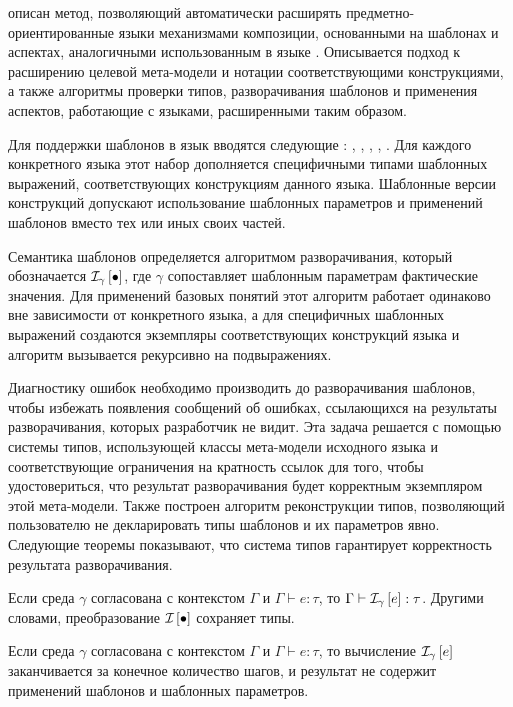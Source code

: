 \renewcommand{\thepart}{4}
 описан метод, позволяющий автоматически расширять предметно-ориентированные языки механизмами композиции, основанными на шаблонах и аспектах, аналогичными использованным в языке \GRM{}. Описывается подход к расширению целевой мета-модели и нотации соответствующими конструкциями, а также алгоритмы проверки типов, разворачивания шаблонов и применения аспектов, работающие с языками, расширенными таким образом.

Для поддержки шаблонов в язык вводятся следующие : , , , , . Для каждого конкретного языка этот набор дополняется специфичными типами шаблонных выражений, соответствующих конструкциям данного языка. Шаблонные версии конструкций допускают использование шаблонных параметров и применений шаблонов вместо тех или иных своих частей. 

Семантика шаблонов определяется алгоритмом разворачивания, который обозначается $\mathcal{I}_{\gamma} \left[ \bullet \right]$, где  $\gamma$ сопоставляет шаблонным параметрам фактические значения. Для применений базовых понятий этот алгоритм работает одинаково вне зависимости от конкретного языка, а для специфичных шаблонных выражений создаются экземпляры соответствующих конструкций языка и алгоритм вызывается рекурсивно на подвыражениях.

Диагностику ошибок необходимо производить до разворачивания шаблонов, чтобы избежать появления сообщений об ошибках, ссылающихся на результаты разворачивания, которых разработчик не видит. Эта задача решается с помощью системы типов, использующей классы мета-модели исходного языка и соответствующие ограничения на кратность ссылок для того, чтобы удостовериться, что результат разворачивания будет корректным экземпляром этой мета-модели. 
Также построен алгоритм реконструкции типов, позволяющий пользователю не декларировать типы шаблонов и их параметров явно. Следующие теоремы показывают, что система типов гарантирует корректность результата разворачивания.

\begin{Th}
Если среда $\gamma$ согласована с контекстом $\Gamma$ и $\Gamma \vdash e : \tau$, то $\Gamma \vdash \mathcal{I}_{\gamma} \left[ e \right] : \tau$. Другими словами, преобразование $\mathcal{I}_{} \left[ \bullet \right]$ сохраняет типы.
\end{Th}

\begin{Th}[О нормализации]
Если среда $\gamma$ согласована с контекстом $\Gamma$ и $\Gamma \vdash e : \tau$, то вычисление $\mathcal{I}_{\gamma} \left[ e \right]$ заканчивается за конечное количество шагов, и результат не содержит применений шаблонов и шаблонных параметров.
\end{Th}

